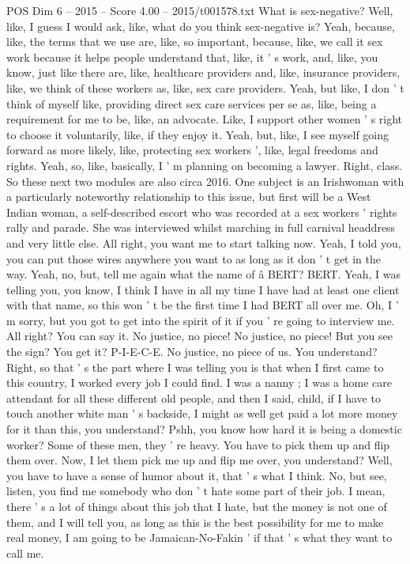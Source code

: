 \begin{textsample}{POS Dim 6 – 2015 – Score 4.00 – 2015/t001578.txt}
What is sex-negative?
Well, like, I guess I would ask, like, what do you think sex-negative is?
Yeah, because, like, the terms that we use are, like, so important, because, like, we call it sex work because it helps people understand that, like, it ' s work, and, like, you know, just like there are, like, healthcare providers and, like, insurance providers, like, we think of these workers as, like, sex care providers.
Yeah, but like, I don ' t think of myself like, providing direct sex care services per se as, like, being a requirement for me to be, like, an advocate.
Like, I support other women ' s right to choose it voluntarily, like, if they enjoy it.
Yeah, but, like, I see myself going forward as more likely, like, protecting sex workers ', like, legal freedoms and rights.
Yeah, so, like, basically, I ' m planning on becoming a lawyer.
Right, class.
So these next two modules are also circa 2016.
One subject is an Irishwoman with a particularly noteworthy relationship to this issue, but first will be a West Indian woman, a self-described escort who was recorded at a sex workers ' rights rally and parade.
She was interviewed whilst marching in full carnival headdress and very little else.
All right, you want me to start talking now.
Yeah, I told you, you can put those wires anywhere you want to as long as it don ' t get in the way.
Yeah, no, but, tell me again what the name of â BERT?
BERT.
Yeah, I was telling you, you know, I think I have in all my time I have had at least one client with that name, so this won ' t be the first time I had BERT all over me.
Oh, I ' m sorry, but you got to get into the spirit of it if you ' re going to interview me.
All right?
You can say it.
No justice, no piece!
No justice, no piece!
But you see the sign?
You get it?
P-I-E-C-E.
No justice, no piece of us.
You understand?
Right, so that ' s the part where I was telling you is that when I first came to this country, I worked every job I could find.
I was a nanny ; I was a home care attendant for all these different old people, and then I said, child, if I have to touch another white man ' s backside, I might as well get paid a lot more money for it than this, you understand?
Pshh, you know how hard it is being a domestic worker?
Some of these men, they ' re heavy.
You have to pick them up and flip them over.
Now, I let them pick me up and flip me over, you understand?
Well, you have to have a sense of humor about it, that ' s what I think.
No, but see, listen, you find me somebody who don ' t hate some part of their job.
I mean, there ' s a lot of things about this job that I hate, but the money is not one of them, and I will tell you, as long as this is the best possibility for me to make real money, I am going to be Jamaican-No-Fakin ' if that ' s what they want to call me.

\end{textsample}
